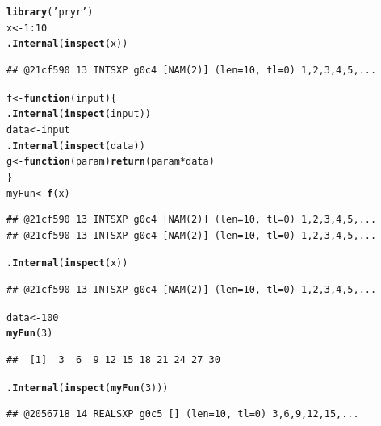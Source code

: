 \documentclass{article}\usepackage[]{graphicx}\usepackage[]{color}
\makeatletter
\newcommand{\hlnum}[1]{\textcolor[rgb]{0.686,0.059,0.569}{#1}}%
\newcommand{\hlstr}[1]{\textcolor[rgb]{0.192,0.494,0.8}{#1}}%
\newcommand{\hlopt}[1]{\textcolor[rgb]{0,0,0}{#1}}%
\newcommand{\hlstd}[1]{\textcolor[rgb]{0.345,0.345,0.345}{#1}}%
\newcommand{\hlkwa}[1]{\textcolor[rgb]{0.161,0.373,0.58}{\textbf{#1}}}%
\newcommand{\hlkwb}[1]{\textcolor[rgb]{0.69,0.353,0.396}{#1}}%
\newcommand{\hlkwc}[1]{\textcolor[rgb]{0.333,0.667,0.333}{#1}}%
\newcommand{\hlkwd}[1]{\textcolor[rgb]{0.737,0.353,0.396}{\textbf{#1}}}%
\newenvironment{kframe}{%
 \def\at@end@of@kframe{}%
 \ifinner\ifhmode%
  \def\at@end@of@kframe{\end{minipage}}%
  \begin{minipage}{\columnwidth}%
 \fi\fi%
 \def\FrameCommand##1{\hskip\@totalleftmargin \hskip-\fboxsep
 \colorbox{shadecolor}{##1}\hskip-\fboxsep
     \hskip-\linewidth \hskip-\@totalleftmargin \hskip\columnwidth}%
 \MakeFramed {\advance\hsize-\width
   \@totalleftmargin\z@ \linewidth\hsize
   \@setminipage}}%
 {\par\unskip\endMakeFramed%
 \at@end@of@kframe}
\newenvironment{knitrout}{}{} %
\makeatother
\begin{document}
\begin{knitrout}
\color{fgcolor}\begin{kframe}
\begin{alltt}
\hlkwd{library}\hlstd{(}\hlstr{'pryr'}\hlstd{)}
\hlstd{x} \hlkwb{<-} \hlnum{1}\hlopt{:}\hlnum{10}
\hlkwd{.Internal}\hlstd{(}\hlkwd{inspect}\hlstd{(x))}
\end{alltt}
\begin{verbatim}
## @21cf590 13 INTSXP g0c4 [NAM(2)] (len=10, tl=0) 1,2,3,4,5,...
\end{verbatim}
\begin{alltt}
\hlstd{f} \hlkwb{<-} \hlkwa{function}\hlstd{(}\hlkwc{input}\hlstd{) \{}
  \hlkwd{.Internal}\hlstd{(}\hlkwd{inspect}\hlstd{(input))}
  \hlstd{data} \hlkwb{<-} \hlstd{input}
  \hlkwd{.Internal}\hlstd{(}\hlkwd{inspect}\hlstd{(data))}
  \hlstd{g} \hlkwb{<-} \hlkwa{function}\hlstd{(}\hlkwc{param}\hlstd{)} \hlkwd{return}\hlstd{(param} \hlopt{*} \hlstd{data)}
\hlstd{\}}
\hlstd{myFun} \hlkwb{<-} \hlkwd{f}\hlstd{(x)}
\end{alltt}
\begin{verbatim}
## @21cf590 13 INTSXP g0c4 [NAM(2)] (len=10, tl=0) 1,2,3,4,5,...
## @21cf590 13 INTSXP g0c4 [NAM(2)] (len=10, tl=0) 1,2,3,4,5,...
\end{verbatim}
\begin{alltt}
\hlkwd{.Internal}\hlstd{(}\hlkwd{inspect}\hlstd{(x))}
\end{alltt}
\begin{verbatim}
## @21cf590 13 INTSXP g0c4 [NAM(2)] (len=10, tl=0) 1,2,3,4,5,...
\end{verbatim}
\begin{alltt}
\hlstd{data} \hlkwb{<-} \hlnum{100}
\hlkwd{myFun}\hlstd{(}\hlnum{3}\hlstd{)}
\end{alltt}
\begin{verbatim}
##  [1]  3  6  9 12 15 18 21 24 27 30
\end{verbatim}
\begin{alltt}
\hlkwd{.Internal}\hlstd{(}\hlkwd{inspect}\hlstd{(}\hlkwd{myFun}\hlstd{(}\hlnum{3}\hlstd{)))}
\end{alltt}
\begin{verbatim}
## @2056718 14 REALSXP g0c5 [] (len=10, tl=0) 3,6,9,12,15,...
\end{verbatim}
\end{kframe}
\end{knitrout}
\end{document}
